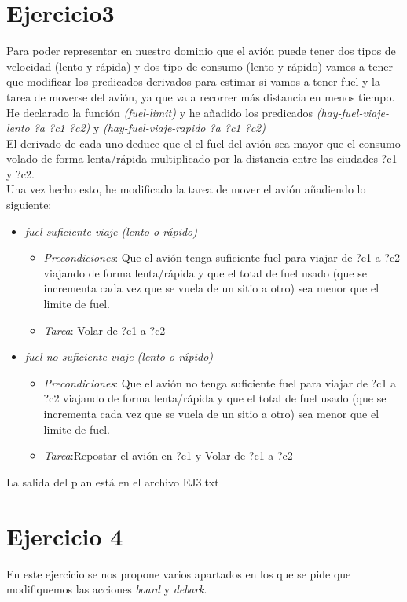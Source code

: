 \documentclass[10pt,spanish]{article}
\begin{document}
	\section*{Ejercicio3}
	Para poder representar en nuestro dominio que el avión puede tener dos tipos de velocidad (lento y rápida) y dos tipo de consumo (lento y rápido) vamos a tener que modificar los predicados derivados para estimar si vamos a tener fuel y la tarea de moverse del avión, ya que va a recorrer más distancia en menos tiempo.\\
	He declarado la función \textit{(fuel-limit)} y he añadido los predicados \textit{(hay-fuel-viaje-lento ?a ?c1 ?c2)} y \textit{(hay-fuel-viaje-rapido ?a ?c1 ?c2)}\\
	El derivado de cada uno deduce que el el fuel del avión  sea mayor que el consumo volado de forma lenta/rápida multiplicado por la distancia entre las ciudades ?c1 y ?c2.\\
	Una vez hecho esto, he modificado la tarea de mover el avión añadiendo lo siguiente:
	\begin{itemize}
		\item \textit{fuel-suficiente-viaje-(lento o rápido)}
		\begin{itemize}
			\item \textit{Precondiciones}: Que el avión tenga suficiente fuel para viajar de ?c1 a ?c2 viajando de forma lenta/rápida y que el total de fuel usado (que se incrementa cada vez que se vuela de un sitio a otro) sea menor que el limite de fuel. 
			\item \textit{Tarea}: Volar de ?c1 a ?c2
		\end{itemize}
		\item \textit{fuel-no-suficiente-viaje-(lento o rápido)}
		\begin{itemize}
			\item \textit{Precondiciones}: Que el avión no tenga suficiente fuel para viajar de ?c1 a ?c2 viajando de forma lenta/rápida y que el total de fuel usado (que se incrementa cada vez que se vuela de un sitio a otro) sea menor que el limite de fuel. 
			\item \textit{Tarea}:Repostar el avión en ?c1 y Volar de ?c1 a ?c2
		\end{itemize}
	\end{itemize}
	La salida del plan está en el archivo EJ3.txt
	\section*{Ejercicio 4}
	En este ejercicio se nos propone varios apartados en los que se pide que modifiquemos las acciones \textit{board} y \textit{debark}. 
\end{document}
